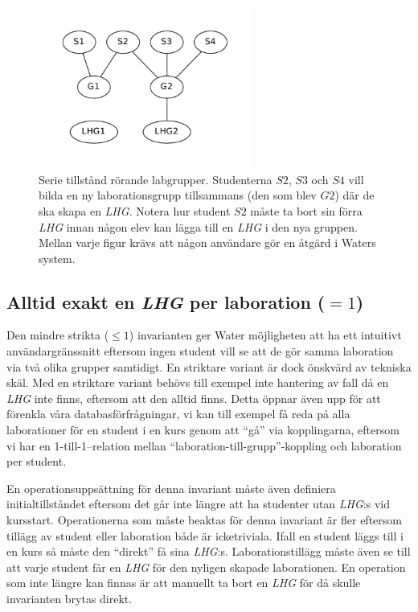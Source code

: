 \begin{figure}
  \includegraphics[width=7.0cm]{fig/labgroup/slack_add_5.pdf}        
  \caption[Serie tillstånd rörande labgrupper.]
  {Serie tillstånd rörande labgrupper. Studenterna $S2$, $S3$ och $S4$ vill
  bilda en ny laborationsgrupp tillsammans (den som blev $G2$) där de ska skapa
  en \emph{LHG}. Notera hur student $S2$ måste ta bort sin förra \emph{LHG} innan någon elev
  kan lägga till en \emph{LHG} i den nya gruppen. Mellan varje figur krävs att någon
  användare gör en åtgärd i Waters system.}
  \label{fig:slack_series}
  
\end{figure}

\subsection{Alltid exakt en \emph{LHG} per laboration ($= 1$)}
Den mindre strikta ($\leq 1$) invarianten ger Water möjligheten att ha ett intuitivt användargränssnitt eftersom ingen student vill se att de gör samma laboration via två olika grupper samtidigt. En striktare variant är dock önskvärd av tekniska skäl. Med en striktare variant behövs till exempel inte hantering av fall då en \emph{LHG} inte finns, eftersom att den alltid finns. Detta öppnar även upp för att förenkla våra databasförfrågningar, vi kan till exempel få reda på alla laborationer för en student i en kurs genom att “gå” via kopplingarna, eftersom vi har en 1-till-1–relation mellan “laboration-till-grupp”-koppling och laboration per student.

En operationsuppsättning för denna invariant måste även definiera initialtillståndet eftersom det går inte längre att ha studenter utan \emph{LHG}:s vid kursstart. Operationerna som måste beaktas för denna invariant är fler eftersom tillägg av student eller laboration både är icketriviala. Ifall en student läggs till i en kurs så måste den “direkt” få sina \emph{LHG}:s. Laborationstillägg måste även se till att varje student får en \emph{LHG} för den nyligen skapade laborationen. En operation som inte längre kan finnas är att manuellt ta bort en \emph{LHG} för då skulle invarianten brytas direkt.

